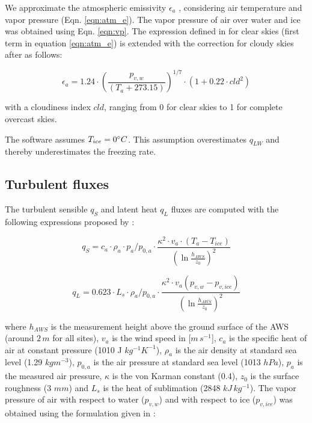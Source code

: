 \documentclass[tc, manuscript]{copernicus}
\begin{document}
We approximate the atmospheric emissivity $\epsilon_a$ ,
considering air temperature and vapor pressure (Eqn. \ref{eqn:atm_e}). The vapor pressure of air over water and
ice was obtained using Eqn. \ref{eqn:vp}.  The expression defined in \cite{brutsaertDerivableFormulaLongwave1975} for clear skies
(first term in equation \ref{eqn:atm_e}) is extended with the correction for cloudy skies after
\cite{brutsaertEvaporationAtmosphereTheory1982} as follows:

\begin{equation}
	\epsilon_a=1.24 \cdot (\frac{p_{v,w}}{(T_a+273.15)})^{1/7}\cdot(1+0.22\cdot{cld}^2) \label{eqn:atm_e}
\end{equation}

with a cloudiness index $cld$, ranging from 0 for clear skies to 1 for complete overcast skies. 

The software assumes $T_{ice} = 0 ^{\circ} C$. This assumption overestimates $q_{LW}$ and thereby underestimates
the freezing rate.

\subsection{Turbulent fluxes} \label{sec:Qs}

The turbulent sensible $q_{S}$ and latent heat $q_{L}$ fluxes are computed with the following expressions
proposed by \cite{garrattAtmosphericBoundaryLayer1992}:

\begin{equation}
	q_{S}= c_{a} \cdot \rho_{a} \cdot p_{a}/p_{0,a} \cdot \frac{\kappa^2 \cdot v_a \cdot
		(T_a-T_{ice})}{{(\ln{\frac{h_{AWS}}{z_{0}}})}^2}
	\label{eqn:qs}
\end{equation}

\begin{equation}
	q_{L}= 0.623 \cdot L_s \cdot \rho_{a}/p_{0,a} \cdot \frac{\kappa^2 \cdot
	v_a(p_{v,w}-p_{v,ice})}{{(\ln{\frac{h_{AWS}}{z_{0}}})}^2}
\end{equation}

where $h_{AWS}$ is the measurement height above the ground surface of the AWS (around $2\,m$ for all sites),
$v_a$ is the wind speed in [$m\,s^{-1}$], $c_a$ is the specific heat of air at constant pressure (1010 J
$kg^{-1} K^{-1}$), $\rho_{a}$ is the air density at standard sea level (1.29 $kg m^{-3}$), $p_{0,a}$ is the air
pressure at standard sea level (1013 $hPa$), $p_{a}$ is the measured air pressure, $\kappa$ is the von Karman
constant (0.4), $z_{0}$ is the surface roughness (3 $mm$) and $L_s$ is the heat of sublimation (2848
$kJ\,kg^{-1}$).  The vapor pressure of air with respect to water ($p_{v,w}$) and with respect to ice
($p_{v,ice}$) was obtained using the formulation given in \cite{huangSimpleAccurateFormula2018} :
\end{document}
